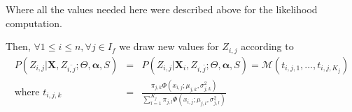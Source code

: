 \documentclass[12pt,a4paper]{report}
\begin{document}
			Where all the values needed here were described above for the likelihood computation.

	Then, $\forall 1\leq i \leq n, \forall j \in I_f$ we draw new values for $Z_{i,j}$ according to
	\begin{eqnarray}
		P(Z_{i,j}|\boldsymbol{X},Z_{\bar{i,j}};\Theta,\boldsymbol{\alpha},S)&=&P(Z_{i,j}|\boldsymbol{X}_i,Z_{i,\bar{j}};\Theta,\boldsymbol{\alpha},S)=\mathcal{M}(t_{i,j,1},\dots ,t_{i,j,K_j}) \\
		\textrm{where } t_{i,j,k}&=&\frac{\pi_{j,k}\Phi(x_{i,j};\mu_{j,k},\sigma_{j,k}^2)}{\sum_{l=1}^{K_j}\pi_{j,l}\Phi(x_{i,j};\mu_{j,l},\sigma_{j,l}^2) }
	\end{eqnarray}
		
\end{document}
